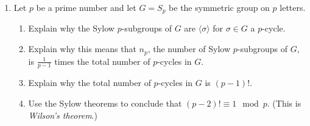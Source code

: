 \documentclass[11pt]{article}
\begin{document}
\begin{enumerate}
\item Let $p$ be a prime number and let $G = S_p$ be the symmetric group on $p$ letters.
\begin{enumerate}
\item Explain why the Sylow $p$-subgroups of $G$ are $\langle \sigma \rangle$ for $\sigma \in G$ a $p$-cycle.
\item Explain why this means that $n_p$, the number of Sylow $p$-subgroups of $G$, is $\frac{1}{p-1}$ times the total number of $p$-cycles in $G$.
\item Explain why the total number of $p$-cycles in $G$ is $(p-1)!$.
\item Use the Sylow theorems to conclude that $(p-2)! \equiv 1 \mod p$. (This is \emph{Wilson's theorem}.)
\end{enumerate}

\end{enumerate}
\end{document}
